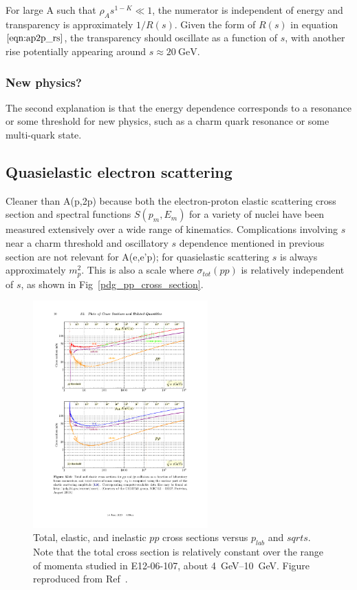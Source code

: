 For large A such that $\rho_As^{1-K}\ll1$, the numerator is independent of
energy and transparency is approximately $1/R(s)$.
Given the form of $R(s)$ in equation~$\ref{eqn:ap2p_rs}$, the transparency
should oscillate as a function of $s$, with another rise potentially
appearing around $s\approx\SI{20}{\giga\electronvolt}$.

\subsubsection{New physics?}
The second explanation is that the energy dependence corresponds to a resonance
or some threshold for new physics, such as a charm quark resonance or some
multi-quark state.

\subsection{Quasielastic electron scattering}
Cleaner than A(p,2p) because both the electron-proton elastic scattering cross section
and spectral functions $S(p_m,E_m)$ for a variety of nuclei
have been measured extensively over a wide range of kinematics.
Complications involving $s$ near a charm threshold and oscillatory $s$
dependence mentioned in previous section are not relevant for A(e,e'p); for
quasielastic scattering $s$ is always approximately $m_p^2$.
This is also a scale where $\sigma_{tot}(pp)$ is relatively independent of $s$,
as shown in Fig~\ref{pdg_pp_cross_section}.

\begin{figure}[!h]
    \centering
    \includegraphics[width=0.6\textwidth]{chap2/pdg_pp_cross_section.pdf}
    \caption{
             Total, elastic, and inelastic $pp$ cross sections versus
             $p_{lab}$ and $sqrt{s}$.
             Note that the total cross section is relatively constant over the
             range of momenta studied in E12-06-107, about
             \SIrange{4}{10}{\giga\electronvolt}.
             Figure reproduced from Ref~\cite{pdg_2020}.
            }
    \label{fig:pdg_pp_cross_section}
\end{figure}

